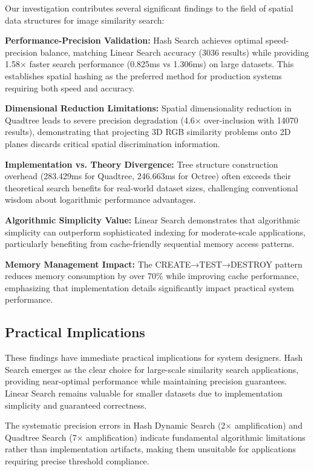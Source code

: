 \documentclass{sbc2023}
\begin{document}
Our investigation contributes several significant findings to the field of spatial data structures for image similarity search:

\textbf{Performance-Precision Validation:} Hash Search achieves optimal speed-precision balance, matching Linear Search accuracy (3036 results) while providing 1.58× faster search performance (0.825ms vs 1.306ms) on large datasets. This establishes spatial hashing as the preferred method for production systems requiring both speed and accuracy.

\textbf{Dimensional Reduction Limitations:} Spatial dimensionality reduction in Quadtree leads to severe precision degradation (4.6× over-inclusion with 14070 results), demonstrating that projecting 3D RGB similarity problems onto 2D planes discards critical spatial discrimination information.

\textbf{Implementation vs. Theory Divergence:} Tree structure construction overhead (283.429ms for Quadtree, 246.663ms for Octree) often exceeds their theoretical search benefits for real-world dataset sizes, challenging conventional wisdom about logarithmic performance advantages.

\textbf{Algorithmic Simplicity Value:} Linear Search demonstrates that algorithmic simplicity can outperform sophisticated indexing for moderate-scale applications, particularly benefiting from cache-friendly sequential memory access patterns.

\textbf{Memory Management Impact:} The CREATE→TEST→DESTROY pattern reduces memory consumption by over 70\% while improving cache performance, emphasizing that implementation details significantly impact practical system performance.

\subsection{Practical Implications}

These findings have immediate practical implications for system designers. Hash Search emerges as the clear choice for large-scale similarity search applications, providing near-optimal performance while maintaining precision guarantees. Linear Search remains valuable for smaller datasets due to implementation simplicity and guaranteed correctness.

The systematic precision errors in Hash Dynamic Search (2× amplification) and Quadtree Search (7× amplification) indicate fundamental algorithmic limitations rather than implementation artifacts, making them unsuitable for applications requiring precise threshold compliance.
\end{document}
